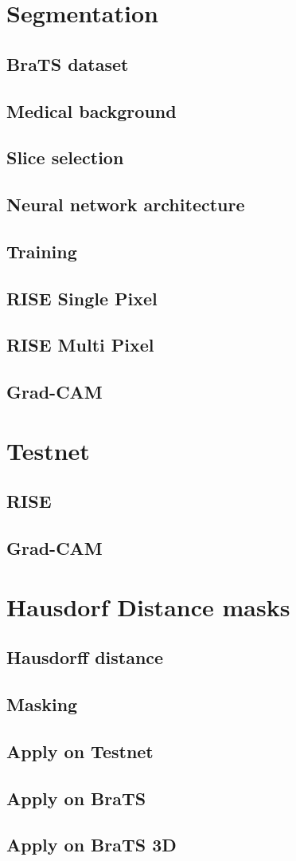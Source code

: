 






\chapter{Segmentation}
\section{BraTS dataset}
\section{Medical background}
\section{Slice selection}
\section{Neural network architecture}
\section{Training}
\section{RISE Single Pixel}
\section{RISE Multi Pixel}
\section{Grad-CAM}

\chapter{Testnet}
\section{RISE}
\section{Grad-CAM}

\chapter{Hausdorf Distance masks}
\section{Hausdorff distance}
\section{Masking}
\section{Apply on Testnet}
\section{Apply on BraTS}
\section{Apply on BraTS 3D}
